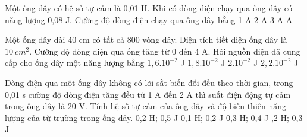 \begin{vidu}%
Một ống dây có hệ số tự cảm là 0,01 H. Khi có dòng điện chạy qua ống dây có năng lượng 0,08 J. Cường độ dòng điện chạy qua ống dây bằng
\choice
{1 A}
{2 A}
{3 A}
{ A}
\end{vidu}

\begin{vidu}%
Một ống dây dài 40 cm có tất cả 800 vòng dây. Diện tích tiết diện ống dây là $10\ cm^2$. Cường độ dòng điện qua ống tăng từ 0 đến 4 A. Hỏi nguồn điện đã cung cấp cho ống dây một năng lượng bằng
\choice
{\True $1,6.10^{-2}$ J}
{$1,8.10^{-2}$ J}
{$2.10^{-2}$ J}
{$2,2.10^{-2}$ J}
\end{vidu}
\begin{vidu}%
	Dòng điện qua một ống dây không có lõi sắt biến đổi đều theo thời gian, trong 0,01 s cường độ dòng điện tăng đều từ 1 A đến 2 A thì suất điện động tự cảm trong ống dây là 20 V. Tính hệ số tự cảm của ống dây và độ biến thiên năng lượng của từ trường trong ống dây.
	\choice
	{0,2 H; 0,5 J}
	{0,1 H; 0,2 J}
	{0,3 H; 0,4 J}
	{,2 H; 0,3 J}
\end{vidu}